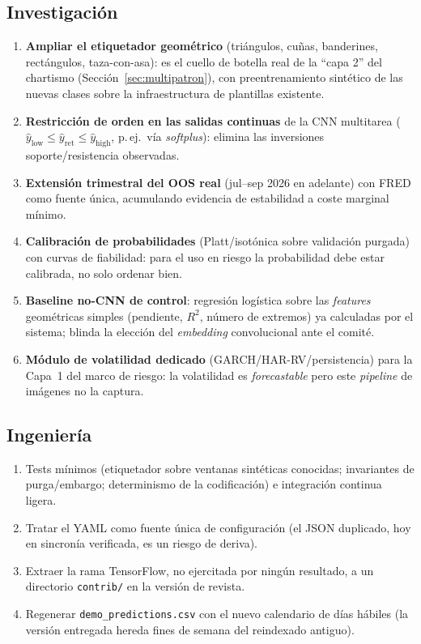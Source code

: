 \documentclass[11pt,a4paper]{article}
\begin{document}
\subsection{Investigación}
\begin{enumerate}
  \item \textbf{Ampliar el etiquetador geométrico} (triángulos, cuñas,
    banderines, rectángulos, taza-con-asa): es el cuello de botella real de la
    ``capa 2'' del chartismo (Sección~\ref{sec:multipatron}), con
    preentrenamiento sintético de las nuevas clases sobre la infraestructura de
    plantillas existente.
  \item \textbf{Restricción de orden en las salidas continuas} de la CNN
    multitarea ($\widehat{y}_{\mathrm{low}} \leq \widehat{y}_{\mathrm{ret}} \leq
    \widehat{y}_{\mathrm{high}}$, p.\,ej.\ vía \emph{softplus}): elimina las
    inversiones soporte/resistencia observadas.
  \item \textbf{Extensión trimestral del OOS real} (jul--sep 2026 en adelante)
    con FRED como fuente única, acumulando evidencia de estabilidad a coste
    marginal mínimo.
  \item \textbf{Calibración de probabilidades} (Platt/isotónica sobre validación
    purgada) con curvas de fiabilidad: para el uso en riesgo la probabilidad
    debe estar calibrada, no solo ordenar bien.
  \item \textbf{Baseline no-CNN de control}: regresión logística sobre las
    \emph{features} geométricas simples (pendiente, $R^2$, número de extremos) ya
    calculadas por el sistema; blinda la elección del \emph{embedding}
    convolucional ante el comité.
  \item \textbf{Módulo de volatilidad dedicado} (GARCH/HAR-RV/persistencia) para
    la Capa~1 del marco de riesgo: la volatilidad es \emph{forecastable} pero
    este \emph{pipeline} de imágenes no la captura.
\end{enumerate}

\subsection{Ingeniería}
\begin{enumerate}
  \item Tests mínimos (etiquetador sobre ventanas sintéticas conocidas;
    invariantes de purga/embargo; determinismo de la codificación) e integración
    continua ligera.
  \item Tratar el YAML como fuente única de configuración (el JSON duplicado,
    hoy en sincronía verificada, es un riesgo de deriva).
  \item Extraer la rama TensorFlow, no ejercitada por ningún resultado, a un
    directorio \texttt{contrib/} en la versión de revista.
  \item Regenerar \texttt{demo\_predictions.csv} con el nuevo calendario de días
    hábiles (la versión entregada hereda fines de semana del reindexado
    antiguo).
\end{enumerate}



\end{document}
